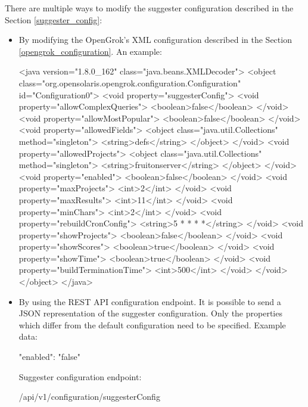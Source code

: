 There are multiple ways to modify the suggester configuration described in the Section \ref{suggester_config}:
\begin{itemize}
    \item By modifying the OpenGrok's XML configuration described in the Section \ref{opengrok_configuration}. An example:
\begin{code}
<java version="1.8.0_162" class="java.beans.XMLDecoder">
  <object
      class="org.opensolaris.opengrok.configuration.Configuration"
      id="Configuration0">
    <void property="suggesterConfig">
      <void property="allowComplexQueries">
        <boolean>false</boolean>
      </void>
      <void property="allowMostPopular">
        <boolean>false</boolean>
      </void>
      <void property="allowedFields">
        <object class="java.util.Collections" method="singleton">
          <string>defs</string>
        </object>
      </void>
      <void property="allowedProjects">
        <object class="java.util.Collections" method="singleton">
          <string>fruitonserver</string>
        </object>
      </void>
      <void property="enabled">
        <boolean>false</boolean>
      </void>
      <void property="maxProjects">
        <int>2</int>
      </void>
      <void property="maxResults">
        <int>11</int>
      </void>
      <void property="minChars">
        <int>2</int>
      </void>
      <void property="rebuildCronConfig">
        <string>5 * * * *</string>
      </void>
      <void property="showProjects">
        <boolean>false</boolean>
      </void>
      <void property="showScores">
        <boolean>true</boolean>
      </void>
      <void property="showTime">
        <boolean>true</boolean>
      </void>
      <void property="buildTerminationTime">
        <int>500</int>
      </void>
    </void>
  </object>
</java>
\end{code}
    \item By using the REST API configuration endpoint. It is possible to send a JSON representation of the suggester
    configuration. Only the properties which differ from the default configuration need to be specified. Example data:
\begin{code}
{"enabled": "false"}
\end{code}
    Suggester configuration endpoint:
\begin{code}
/api/v1/configuration/suggesterConfig
\end{code}

\end{itemize}
